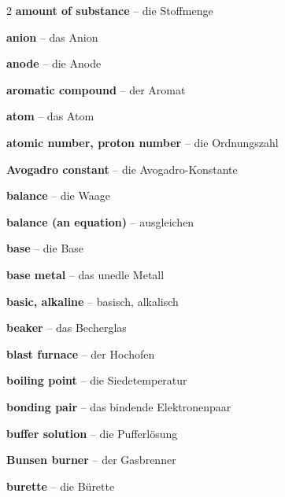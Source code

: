 \begin{multicols}{2}
\textbf{amount of substance} -- die Stoffmenge\dotfill\hyperref[e:248]{\pageref*{e:248}}\par
\textbf{anion} -- das Anion\dotfill\hyperref[e:95]{\pageref*{e:95}}\par
\textbf{anode} -- die Anode\dotfill\hyperref[e:198]{\pageref*{e:198}}\par
\textbf{aromatic compound} -- der Aromat\dotfill\hyperref[e:217]{\pageref*{e:217}}\par
\textbf{atom} -- das Atom\dotfill\hyperref[e:72]{\pageref*{e:72}}\par
\textbf{atomic number, proton number} -- die Ordnungszahl\dotfill\hyperref[e:80]{\pageref*{e:80}}\par
\textbf{Avogadro constant} -- die Avogadro-Konstante\dotfill\hyperref[e:250]{\pageref*{e:250}}\par

\par\nopagebreak
\textbf{balance} -- die Waage\dotfill\hyperref[e:59]{\pageref*{e:59}}\par
\textbf{balance (an equation)} -- ausgleichen\dotfill\hyperref[e:130]{\pageref*{e:130}}\par
\textbf{base} -- die Base\dotfill\hyperref[e:153]{\pageref*{e:153}}\par
\textbf{base metal} -- das unedle Metall\dotfill\hyperref[e:193]{\pageref*{e:193}}\par
\textbf{basic, alkaline} -- basisch, alkalisch\dotfill\hyperref[e:157]{\pageref*{e:157}}\par
\textbf{beaker} -- das Becherglas\dotfill\hyperref[e:40]{\pageref*{e:40}}\par
\textbf{blast furnace} -- der Hochofen\dotfill\hyperref[e:207]{\pageref*{e:207}}\par
\textbf{boiling point} -- die Siedetemperatur\dotfill\hyperref[e:26]{\pageref*{e:26}}\par
\textbf{bonding pair} -- das bindende Elektronenpaar\dotfill\hyperref[e:110]{\pageref*{e:110}}\par
\textbf{buffer solution} -- die Pufferlösung\dotfill\hyperref[e:177]{\pageref*{e:177}}\par
\textbf{Bunsen burner} -- der Gasbrenner\dotfill\hyperref[e:46]{\pageref*{e:46}}\par
\textbf{burette} -- die Bürette\dotfill\hyperref[e:51]{\pageref*{e:51}}\par


\end{multicols}
